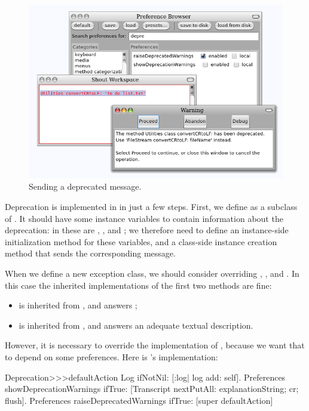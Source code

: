 \documentclass[a4paper,10pt,twoside]{book}
\begin{document}
\begin{figure}[ht]\centering
        \includegraphics[width=\linewidth]{Deprecation}
        \caption{Sending a deprecated message.}
\end{figure}

Deprecation is implemented in \pharo in just a few steps.
First, we define  as a subclass of .
It should have some instance variables to contain information about the deprecation: in 
\pharo{} these are , ,  and ; we therefore need to define an instance-side initialization method for these variables, and a class-side instance creation method that sends the corresponding message.

When we define a new exception class, we should consider overriding , , and .
In this case the inherited implementations of the first two methods are fine:

\begin{itemize}
\item {} is inherited from , and answers ;
\item {} is inherited from , and answers an adequate textual description.
\end{itemize}

However, it is necessary to override the implementation of , because we want that to depend on some preferences.  Here is \pharo's implementation:
\begin{code}{}
Deprecation>>>defaultAction
	Log ifNotNil: [:log| log add: self].
	Preferences showDeprecationWarnings ifTrue:
		[Transcript nextPutAll: explanationString; cr; flush].
	Preferences raiseDeprecatedWarnings ifTrue:
		[super defaultAction]
\end{code}
\end{document}
